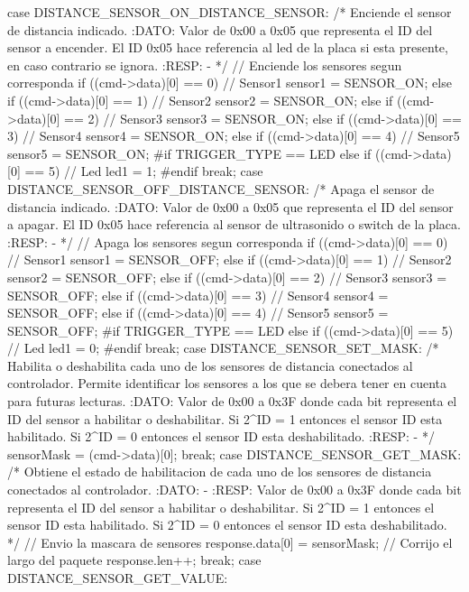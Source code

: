{\begin{verbatimtab}
{{ 		case DISTANCE_SENSOR_ON_DISTANCE_SENSOR:
			/* Enciende el sensor de distancia indicado.
			:DATO:
			Valor de 0x00 a 0x05 que representa el ID del sensor a encender.
			El ID 0x05 hace referencia al led de la placa si esta presente, 
			en caso contrario se ignora.
			:RESP:
			-
			*/
			// Enciende los sensores segun corresponda
			if ((cmd->data)[0] == 0)
				// Sensor1
				sensor1 = SENSOR_ON;
			else if ((cmd->data)[0] == 1)
				// Sensor2
				sensor2 = SENSOR_ON;
			else if ((cmd->data)[0] == 2)
				// Sensor3
				sensor3 = SENSOR_ON;
			else if ((cmd->data)[0] == 3)
				// Sensor4
				sensor4 = SENSOR_ON;
			else if ((cmd->data)[0] == 4)
				// Sensor5
				sensor5 = SENSOR_ON;
#if TRIGGER_TYPE == LED
			else if ((cmd->data)[0] == 5)
				// Led
				led1 = 1;
#endif
		break;
 		case DISTANCE_SENSOR_OFF_DISTANCE_SENSOR:
			/* Apaga el sensor de distancia indicado.
			:DATO:
			Valor de 0x00 a 0x05 que representa el ID del sensor a apagar. El
			ID 0x05 hace referencia al sensor de ultrasonido o switch de la placa.
			:RESP:
			-
			*/
			// Apaga los sensores segun corresponda
			if ((cmd->data)[0] == 0)
				// Sensor1
				sensor1 = SENSOR_OFF;
			else if ((cmd->data)[0] == 1)
				// Sensor2
				sensor2 = SENSOR_OFF;
			else if ((cmd->data)[0] == 2)
				// Sensor3
				sensor3 = SENSOR_OFF;
			else if ((cmd->data)[0] == 3)
				// Sensor4
				sensor4 = SENSOR_OFF;
			else if ((cmd->data)[0] == 4)
				// Sensor5
				sensor5 = SENSOR_OFF;
#if TRIGGER_TYPE == LED
			else if ((cmd->data)[0] == 5)
				// Led
				led1 = 0;
#endif
		break;
 		case DISTANCE_SENSOR_SET_MASK:
			/* Habilita o deshabilita cada uno de los sensores de distancia conectados al
			controlador. Permite identificar los sensores a los que se debera tener en
			cuenta para futuras lecturas.
			:DATO:
			Valor de 0x00 a 0x3F donde cada bit representa el ID del sensor a
			habilitar o deshabilitar. Si 2^ID = 1 entonces el sensor ID esta habilitado.
			Si 2^ID = 0 entonces el sensor ID esta deshabilitado.
			:RESP:
			-
			*/
			sensorMask = (cmd->data)[0];
		break;
 		case DISTANCE_SENSOR_GET_MASK:
			/* Obtiene el estado de habilitacion de cada uno de los sensores de distancia
			conectados al controlador.
			:DATO:
			-
			:RESP:
			Valor de 0x00 a 0x3F donde cada bit representa el ID del sensor a
			habilitar o deshabilitar. Si 2^ID = 1 entonces el sensor ID esta habilitado.
			Si 2^ID = 0 entonces el sensor ID esta deshabilitado.
			*/
			// Envio la mascara de sensores
			response.data[0] = sensorMask;
			// Corrijo el largo del paquete
			response.len++;
		break;
 		case DISTANCE_SENSOR_GET_VALUE:
}}
\end{verbatimtab}}
